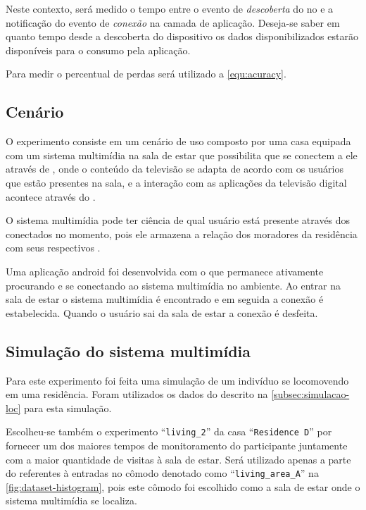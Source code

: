Neste contexto, será medido o tempo entre o evento de \emph{descoberta} do \smartobj no \stwopa e a notificação do evento de \emph{conexão} na camada de aplicação.
Deseja-se saber em quanto tempo desde a descoberta do dispositivo os dados disponibilizados estarão disponíveis para o consumo pela aplicação.

Para medir o percentual de perdas será utilizado a \autoref{equ:acuracy}.

\subsection{Cenário}

O experimento consiste em um cenário de uso composto por uma casa equipada com um sistema multimídia na sala de estar que possibilita que \smartphones se conectem a ele através de \bluetooth, onde o conteúdo da televisão se adapta de acordo com os usuários que estão presentes na sala, e a interação com as aplicações da televisão digital acontece através do \smartphone.

O sistema multimídia pode ter ciência de qual usuário está presente através dos \smartphones conectados no momento, pois ele armazena a relação dos moradores da residência com seus respectivos \smartphones.


Uma aplicação android foi desenvolvida com o \middleware \mhubcddl que permanece ativamente procurando e se conectando ao sistema multimídia no ambiente. Ao entrar na sala de estar o sistema multimídia é encontrado e em seguida a conexão é estabelecida. Quando o usuário sai da sala de estar a conexão é desfeita. 



\subsection{Simulação do sistema multimídia}

Para este experimento foi feita uma simulação de um indivíduo se locomovendo em uma residência. Foram utilizados os dados do \dataset descrito na \autoref{subsec:simulacao-loc} para esta simulação.

Escolheu-se também o experimento ``\texttt{living\_2}'' da casa ``\texttt{Residence D}'' por fornecer um dos maiores tempos de monitoramento do participante juntamente com a maior quantidade de visitas à sala de estar. Será utilizado apenas a parte do \dataset referentes à entradas no cômodo denotado como ``\texttt{living\_area\_A}'' na \autoref{fig:dataset-histogram}, pois este cômodo foi escolhido como a sala de estar onde o sistema multimídia se localiza.

